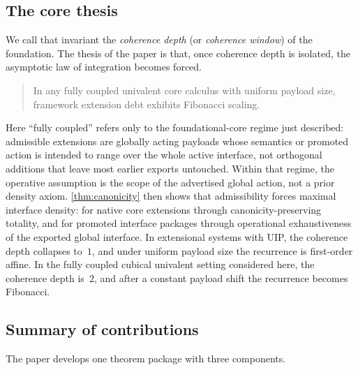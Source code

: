 \documentclass{lmcs}
\begin{document}
\subsection{The core thesis}

We call that invariant the \emph{coherence depth} (or \emph{coherence window}) of the foundation. The thesis of the paper is that, once coherence depth is isolated, the asymptotic law of integration becomes forced.

\begin{quote}
In any fully coupled univalent core calculus with uniform payload size, framework extension debt exhibits Fibonacci scaling.
\end{quote}

Here ``fully coupled'' refers only to the foundational-core regime just described: admissible extensions are globally acting payloads whose semantics or promoted action is intended to range over the whole active interface, not orthogonal additions that leave most earlier exports untouched. Within that regime, the operative assumption is the scope of the advertised global action, not a prior density axiom. \autoref{thm:canonicity} then shows that admissibility forces maximal interface density: for native core extensions through canonicity-preserving totality, and for promoted interface packages through operational exhaustiveness of the exported global interface. In extensional systems with UIP, the coherence depth collapses to~$1$, and under uniform payload size the recurrence is first-order affine. In the fully coupled cubical univalent setting considered here, the coherence depth is~$2$, and after a constant payload shift the recurrence becomes Fibonacci.

\subsection{Summary of contributions}

The paper develops one theorem package with three components.
\end{document}
